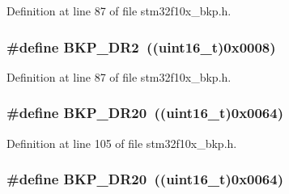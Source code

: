 Definition at line 87 of file stm32f10x\+\_\+bkp.\+h.

\subsubsection[{\texorpdfstring{B\+K\+P\+\_\+\+D\+R2}{BKP_DR2}}]{\setlength{\rightskip}{0pt plus 5cm}\#define B\+K\+P\+\_\+\+D\+R2~(({\bf uint16\+\_\+t})0x0008)}\hypertarget{group___data___backup___register_ga73867f10a3ef17eeb0d3ace641f185ad}{}\label{group___data___backup___register_ga73867f10a3ef17eeb0d3ace641f185ad}


Definition at line 87 of file stm32f10x\+\_\+bkp.\+h.

\subsubsection[{\texorpdfstring{B\+K\+P\+\_\+\+D\+R20}{BKP_DR20}}]{\setlength{\rightskip}{0pt plus 5cm}\#define B\+K\+P\+\_\+\+D\+R20~(({\bf uint16\+\_\+t})0x0064)}\hypertarget{group___data___backup___register_gaafdc2f269b669c81734360e09d94cee2}{}\label{group___data___backup___register_gaafdc2f269b669c81734360e09d94cee2}


Definition at line 105 of file stm32f10x\+\_\+bkp.\+h.

\subsubsection[{\texorpdfstring{B\+K\+P\+\_\+\+D\+R20}{BKP_DR20}}]{\setlength{\rightskip}{0pt plus 5cm}\#define B\+K\+P\+\_\+\+D\+R20~(({\bf uint16\+\_\+t})0x0064)}\hypertarget{group___data___backup___register_gaafdc2f269b669c81734360e09d94cee2}{}\label{group___data___backup___register_gaafdc2f269b669c81734360e09d94cee2}


